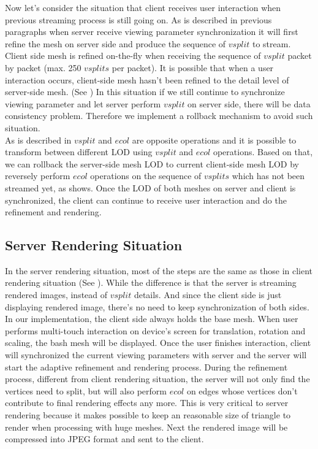 
Now let's consider the situation that client receives user interaction when previous streaming process is still going on. As is described in previous paragraphs when server receive viewing parameter synchronization it will first refine the mesh on server side and produce the sequence of $vsplit$ to stream. Client side mesh is refined on-the-fly when receiving the sequence of $vsplit$ packet by packet (max. 250 $vsplits$ per packet). It is possible that when a user interaction occurs, client-side mesh hasn't been refined to the detail level of server-side mesh. (See ) In this situation if we still continue to synchronize viewing parameter and let server perform $vsplit$ on server side, there will be data consistency problem. Therefore we implement a rollback mechanism to avoid such situation. \\


As is described in  $vsplit$ and $ecol$ are opposite operations and it is possible to transform between different LOD using $vsplit$ and $ecol$ operations. Based on that, we can rollback the server-side mesh LOD to current client-side mesh LOD by reversely perform $ecol$ operations on the sequence of $vsplits$ which has not been streamed yet, as  shows. Once the LOD of both meshes on server and client is synchronized, the client can continue to receive user interaction and do the refinement and rendering.

\subsection{Server Rendering Situation}
\label{section:serverrenderingvdpm}

In the server rendering situation, most of the steps are the same as those in client rendering situation (See ). While the difference is that the server is streaming rendered images, instead of $vsplit$ details. And since the client side is just displaying rendered image, there's no need to keep synchronization of both sides. In our implementation, the client side always holds the base mesh. When user performs multi-touch interaction on device's screen for translation, rotation and scaling, the bash mesh will be displayed. Once the user finishes interaction, client will synchronized the current viewing parameters with server and the server will start the adaptive refinement and rendering process. During the refinement process, different from client rendering situation, the server will not only find the vertices need to split, but will also perform $ecol$ on edges whose vertices don't contribute to final rendering effects any more. This is very critical to server rendering because it makes possible to keep an reasonable size of triangle to render when processing with huge meshes. Next the rendered image will be compressed into JPEG format and sent to the client.  

